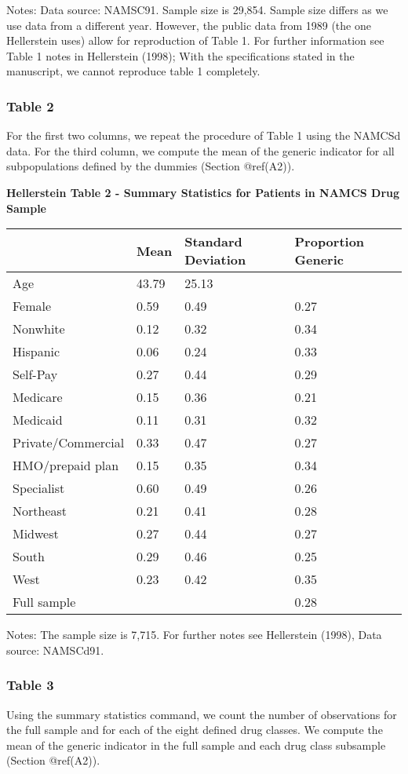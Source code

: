 \documentclass[
]{book}
\begin{document}
Notes: Data source: NAMSC91. Sample size is 29,854. Sample size differs
as we use data from a different year. However, the public data from 1989
(the one Hellerstein uses) allow for reproduction of Table 1. For
further information see Table 1 notes in Hellerstein (1998); With the
specifications stated in the manuscript, we cannot reproduce table 1
completely.

\hypertarget{table-2}{%
\subsubsection{Table 2}\label{table-2}}

For the first two columns, we repeat the procedure of Table 1 using the
NAMCSd data. For the third column, we compute the mean of the generic
indicator for all subpopulations defined by the dummies (Section
@ref(A2)).

\textbf{Hellerstein Table 2 - Summary Statistics for Patients in NAMCS
Drug Sample}

\begin{longtable}[]{@{}llll@{}}
\toprule
& Mean & Standard Deviation & Proportion Generic\tabularnewline
\midrule
\endhead
Age & 43.79 & 25.13 &\tabularnewline
Female & 0.59 & 0.49 & 0.27\tabularnewline
Nonwhite & 0.12 & 0.32 & 0.34\tabularnewline
Hispanic & 0.06 & 0.24 & 0.33\tabularnewline
Self-Pay & 0.27 & 0.44 & 0.29\tabularnewline
Medicare & 0.15 & 0.36 & 0.21\tabularnewline
Medicaid & 0.11 & 0.31 & 0.32\tabularnewline
Private/Commercial & 0.33 & 0.47 & 0.27\tabularnewline
HMO/prepaid plan & 0.15 & 0.35 & 0.34\tabularnewline
Specialist & 0.60 & 0.49 & 0.26\tabularnewline
Northeast & 0.21 & 0.41 & 0.28\tabularnewline
Midwest & 0.27 & 0.44 & 0.27\tabularnewline
South & 0.29 & 0.46 & 0.25\tabularnewline
West & 0.23 & 0.42 & 0.35\tabularnewline
Full sample & & & 0.28\tabularnewline
\bottomrule
\end{longtable}

Notes: The sample size is 7,715. For further notes see Hellerstein
(1998), Data source: NAMSCd91.

\hypertarget{table-3}{%
\subsubsection{Table 3}\label{table-3}}

Using the summary statistics command, we count the number of
observations for the full sample and for each of the eight defined drug
classes. We compute the mean of the generic indicator in the full sample
and each drug class subsample (Section @ref(A2)).
\end{document}
